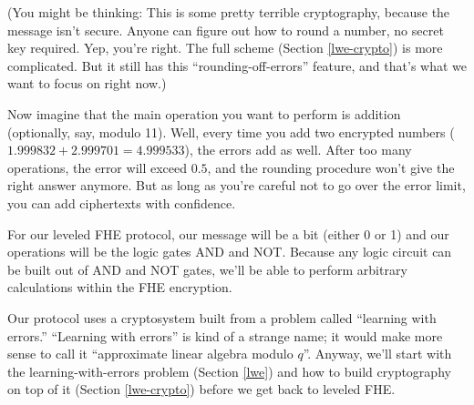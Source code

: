 (You might be thinking: This is some pretty terrible cryptography,
because the message isn't secure. Anyone can figure out how to round a
number, no secret key required. Yep, you're right. The full scheme
(Section \ref{lwe-crypto}) is more complicated. But it still has this
``rounding-off-errors'' feature, and that's what we want to focus on
right now.)

Now imagine that the main operation you want to perform is addition
(optionally, say, modulo 11). Well, every time you add two encrypted
numbers ($1.999832 + 2.999701 = 4.999533$), the errors add as well.
After too many operations, the error will exceed $0.5$, and the
rounding procedure won't give the right answer anymore. But as long
as you're careful not to go over the error limit, you can add
ciphertexts with confidence.

For our leveled FHE protocol, our message will be a bit (either 0 or 1)
and our operations will be the logic gates AND and NOT. Because any
logic circuit can be built out of AND and NOT gates, we'll be able to
perform arbitrary calculations within the FHE encryption.

Our protocol uses a cryptosystem built from a problem called
``\alert{learning with errors}.''
``Learning with errors'' is kind of a strange name; it
would make more sense to call it ``approximate linear algebra modulo $q$''.
Anyway, we'll start with the learning-with-errors problem
(Section \ref{lwe}) and how to build cryptography on top of it
(Section \ref{lwe-crypto}) before we get back to leveled FHE.
